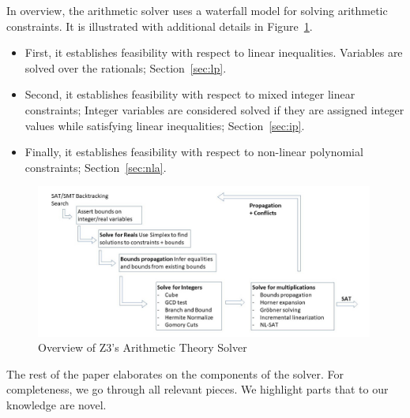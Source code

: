 In overview, the arithmetic solver uses a waterfall model for solving arithmetic constraints.
It is illustrated with additional details in Figure~\ref{fig:organization}.


\begin{itemize}
  \item First, it establishes feasibility with respect to linear inequalities. Variables are solved over the rationals; Section~\ref{sec:lp}.
  \item Second, it establishes feasibility with respect to mixed integer linear constraints; 
        Integer variables are considered solved if they are assigned integer values while satisfying linear inequalities; Section~\ref{sec:ip}. 
  \item Finally, it establishes feasibility with respect to non-linear polynomial constraints; Section~\ref{sec:nla}.
\end{itemize}


\begin{figure}[htbp]
  \centering
  \includegraphics[width=0.99\textwidth]{figures/Arithmetic.jpg}
  \caption{Overview of Z3's Arithmetic Theory Solver }
  \label{fig:organization}
\end{figure}

The rest of the paper elaborates on the components of the solver. For completeness, we
go through all relevant pieces. We highlight parts that to our knowledge are novel.


